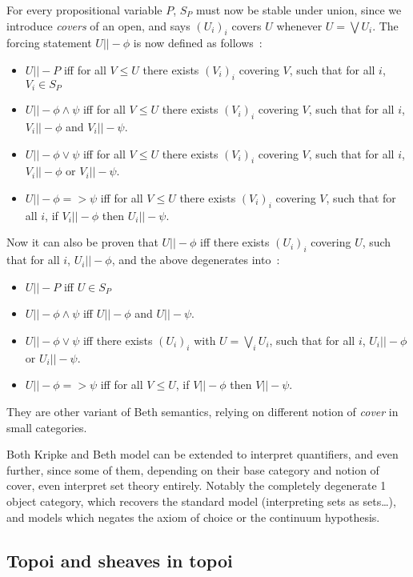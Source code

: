 \documentclass[11pt]{article}
\newcommand{\0}{\mathbf{0}}
\newcommand{\1}{\mathbf{1}}
\begin{document}
For every propositional variable $P$, $S_P$ must now be stable under union, since we introduce \emph{covers} of an open, and says $(U_i)_i$ covers $U$ whenever $U = \bigvee U_i$. The forcing statement $U ||- \phi$ is now defined as follows~:
\begin{itemize}
    \item $U ||- P$ iff for all $V \leq U$ there exists $(V_i)_i$ covering $V$, such that for all $i$, $V_i \in S_P$
    \item $U ||- \phi \wedge \psi$ iff for all $V \leq U$ there exists $(V_i)_i$ covering $V$, such that for all $i$, $V_i ||- \phi$ and $V_i ||- \psi $.
    \item $U ||- \phi \vee \psi $ iff for all $V \leq U$ there exists $(V_i)_i$ covering $V$, such that for all $i$, $V_i ||- \phi$ or $V_i ||- \psi $.
    \item $U ||- \phi => \psi $ iff for all $V \leq U$ there exists $(V_i)_i$ covering $V$, such that for all $i$, if $V_i ||- \phi$ then $U_i ||- \psi $.
\end{itemize}
Now it can also be proven that $U ||- \phi$ iff there exists $(U_i)_i$ covering $U$, such that for all $i$, $U_i||- \phi$, and the above degenerates into~:
\begin{itemize}
    \item $U ||- P$ iff $U \in S_P$
    \item $U ||- \phi \wedge \psi$ iff $U ||- \phi$ and $U ||- \psi $.
    \item $U ||- \phi \vee \psi $ iff there exists $(U_i)_i$ with $U = \bigvee_i U_i$, such that for all $i$, $U_i ||- \phi$ or $U_i ||- \psi $.
    \item $U ||- \phi => \psi $ iff for all $V \leq U$, if $V ||- \phi$ then $V ||- \psi $.
\end{itemize}

They are other variant of Beth semantics, relying on different notion of \emph{cover} in small categories.

Both Kripke and Beth model can be extended to interpret quantifiers, and even further, since some of them, depending on their base category and notion of cover, even interpret set theory entirely. Notably the completely degenerate 1 object category, which recovers the standard model (interpreting sets as sets\dots), and models which negates the axiom of choice or the continuum hypothesis.

\subsection{Topoi and sheaves in topoi}\label{topoi}
\end{document}
